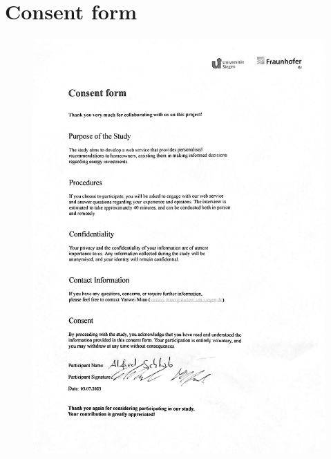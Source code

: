 \clearpage %

\chapter{Consent form}
\label{appendix:consentform}

\begin{figure}[h]
    \centering
    \includegraphics[width=\textwidth]{Images/consent_a.jpg}
\end{figure}

